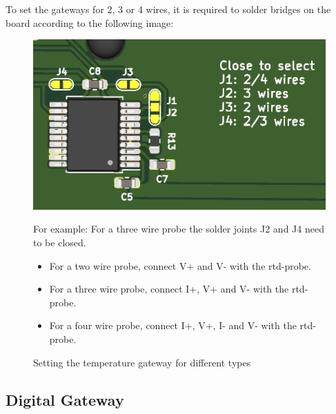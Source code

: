 \documentclass[10pt,letterpaper]{article}
\begin{document}
			To set the gateways for 2, 3 or 4 wires, it is required to solder bridges on the board according to the following image:
			\begin{figure}[ht!]
				
				\begin{minipage}{0.5\textwidth}
					\includegraphics[width=\textwidth]{Figures/rtdsolderpoints.png}
				\end{minipage}
				\begin{minipage}{0.45\textwidth}
					For example: For a three wire probe the solder joints J2 and J4 need to be closed.\\
					\begin{itemize}
						\item For a two wire probe, connect V+ and V- with the rtd-probe.
						\item For a three wire probe, connect I+, V+ and V- with the rtd-probe.
						\item For a four wire probe, connect I+, V+, I- and V- with the rtd-probe.
					\end{itemize}

				\end{minipage}
				\caption{Setting the temperature gateway for different types}
				\label{fig:max31865}
			\end{figure}


\newpage
		\subsection{Digital Gateway}
\end{document}
